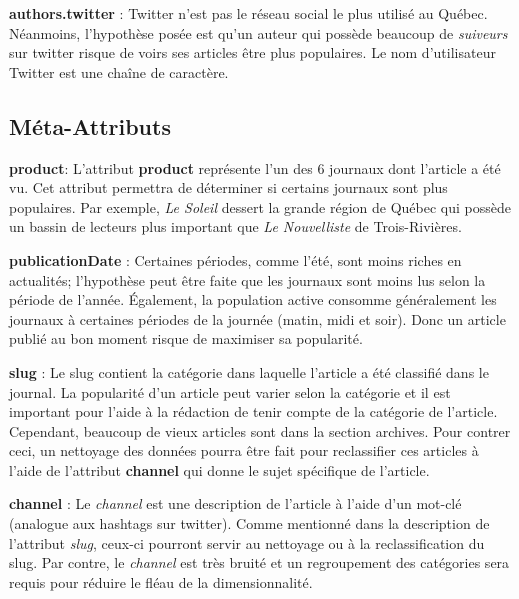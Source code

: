 \documentclass[french]{article}
\begin{document}
\textbf{authors.twitter} : Twitter n'est pas le réseau social le plus utilisé au Québec. Néanmoins, l'hypothèse posée est qu'un auteur qui possède beaucoup de \emph{suiveurs} sur twitter risque de voirs ses articles être plus populaires. Le nom d'utilisateur Twitter est une chaîne de caractère.


\subsection{Méta-Attributs}

\textbf{product}: L'attribut \textbf{product} représente l'un des 6 journaux dont l'article a été vu. Cet attribut permettra de déterminer si certains journaux sont plus populaires. Par exemple, \emph{Le Soleil} dessert la grande région de Québec qui possède un bassin de lecteurs plus important que \emph{Le Nouvelliste} de Trois-Rivières.

\textbf{publicationDate} : Certaines périodes, comme l'été, sont moins riches en actualités; l'hypothèse peut être faite que les journaux sont moins lus selon la période de l'année. Également, la population active consomme généralement les journaux à certaines périodes de la journée (matin, midi et soir). Donc un article publié au bon moment risque de maximiser sa popularité.

\textbf{slug} : Le slug contient la catégorie dans laquelle l'article a été classifié dans le journal. La popularité d'un article peut varier selon la catégorie et il est important pour l'aide à la rédaction de tenir compte de la catégorie de l'article. Cependant, beaucoup de vieux articles sont dans la section archives. Pour contrer ceci, un nettoyage des données pourra être fait pour reclassifier ces articles à l'aide de l'attribut \textbf{channel} qui donne le sujet spécifique de l'article.

\textbf{channel} : Le \emph{channel} est une description de l'article à l'aide d'un mot-clé (analogue aux hashtags sur twitter). Comme mentionné dans la description de l'attribut \emph{slug}, ceux-ci pourront servir au nettoyage ou à la reclassification du slug. Par contre, le \emph{channel} est très bruité et un regroupement des catégories sera requis pour réduire le fléau de la dimensionnalité.

\end{document}
